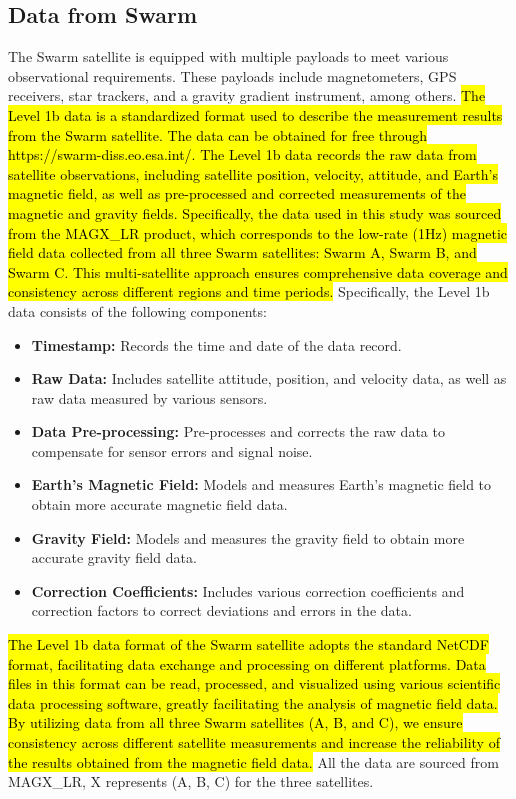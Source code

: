 \documentclass[3p,authoryear,preprint,12pt]{elsarticle}
\begin{document}
\subsection{Data from Swarm}
The Swarm satellite is equipped with multiple payloads to meet various observational requirements. These payloads include magnetometers, GPS receivers, star trackers, and a gravity gradient instrument, among others. \hl{The Level 1b data is a standardized format used to describe the measurement results from the Swarm satellite. The data can be obtained for free through https://swarm-diss.eo.esa.int/. The Level 1b data records the raw data from satellite observations, including satellite position, velocity, attitude, and Earth's magnetic field, as well as pre-processed and corrected measurements of the magnetic and gravity fields. Specifically, the data used in this study was sourced from the MAGX\_LR product, which corresponds to the low-rate (1Hz) magnetic field data collected from all three Swarm satellites: Swarm A, Swarm B, and Swarm C. This multi-satellite approach ensures comprehensive data coverage and consistency across different regions and time periods.
} Specifically, the Level 1b data consists of the following components:
\begin{itemize}
	\item \textbf{Timestamp:} Records the time and date of the data record.
	\item \textbf{Raw Data:} Includes satellite attitude, position, and velocity data, as well as raw data measured by various sensors.
	\item \textbf{Data Pre-processing:}	Pre-processes and corrects the raw data to compensate for sensor errors and signal noise.
	\item \textbf{Earth's Magnetic Field:} Models and measures Earth's magnetic field to obtain more accurate magnetic field data.
	\item \textbf{Gravity Field:} Models and measures the gravity field to obtain more accurate gravity field data.
	\item \textbf{Correction Coefficients:} Includes various correction coefficients and correction factors to correct deviations and errors in the data.	
\end{itemize}

\hl{The Level 1b data format of the Swarm satellite adopts the standard NetCDF format, facilitating data exchange and processing on different platforms. Data files in this format can be read, processed, and visualized using various scientific data processing software, greatly facilitating the analysis of magnetic field data. By utilizing data from all three Swarm satellites (A, B, and C), we ensure consistency across different satellite measurements and increase the reliability of the results obtained from the magnetic field data.
} {All the data are sourced from MAGX\_LR, X represents (A, B, C) for the three satellites.} 
\end{document}

